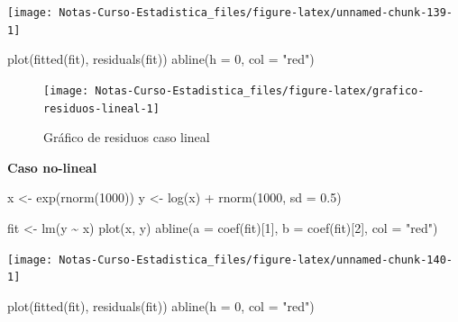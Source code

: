\documentclass[
  12pt,
]{book}
\newenvironment{Shaded}{\begin{snugshade}}{\end{snugshade}}
\newcommand{\AttributeTok}[1]{\textcolor[rgb]{0.77,0.63,0.00}{#1}}
\newcommand{\DecValTok}[1]{\textcolor[rgb]{0.00,0.00,0.81}{#1}}
\newcommand{\FloatTok}[1]{\textcolor[rgb]{0.00,0.00,0.81}{#1}}
\newcommand{\FunctionTok}[1]{\textcolor[rgb]{0.00,0.00,0.00}{#1}}
\newcommand{\NormalTok}[1]{#1}
\newcommand{\OtherTok}[1]{\textcolor[rgb]{0.56,0.35,0.01}{#1}}
\newcommand{\SpecialCharTok}[1]{\textcolor[rgb]{0.00,0.00,0.00}{#1}}
\newcommand{\StringTok}[1]{\textcolor[rgb]{0.31,0.60,0.02}{#1}}
\theoremstyle{definition}
\theoremstyle{definition}
\theoremstyle{definition}
\theoremstyle{definition}
\theoremstyle{remark}
\begin{document}
\begin{center}\texttt{[image: Notas-Curso-Estadistica\_files/figure-latex/unnamed-chunk-139-1]} \end{center}

\begin{Shaded}
\begin{Highlighting}[]
\FunctionTok{plot}\NormalTok{(}\FunctionTok{fitted}\NormalTok{(fit), }\FunctionTok{residuals}\NormalTok{(fit))}
\FunctionTok{abline}\NormalTok{(}\AttributeTok{h =} \DecValTok{0}\NormalTok{, }\AttributeTok{col =} \StringTok{"red"}\NormalTok{)}
\end{Highlighting}
\end{Shaded}

\begin{figure}

{\centering \texttt{[image: Notas-Curso-Estadistica\_files/figure-latex/grafico-residuos-lineal-1]} 

}

\caption{Gráfico de residuos caso lineal}\label{fig:grafico-residuos-lineal}
\end{figure}

\textbf{Caso no-lineal}

\begin{Shaded}
\begin{Highlighting}[]
\NormalTok{x }\OtherTok{\textless{}{-}} \FunctionTok{exp}\NormalTok{(}\FunctionTok{rnorm}\NormalTok{(}\DecValTok{1000}\NormalTok{))}
\NormalTok{y }\OtherTok{\textless{}{-}} \FunctionTok{log}\NormalTok{(x) }\SpecialCharTok{+} \FunctionTok{rnorm}\NormalTok{(}\DecValTok{1000}\NormalTok{, }\AttributeTok{sd =} \FloatTok{0.5}\NormalTok{)}

\NormalTok{fit }\OtherTok{\textless{}{-}} \FunctionTok{lm}\NormalTok{(y }\SpecialCharTok{\textasciitilde{}}\NormalTok{ x)}
\FunctionTok{plot}\NormalTok{(x, y)}
\FunctionTok{abline}\NormalTok{(}\AttributeTok{a =} \FunctionTok{coef}\NormalTok{(fit)[}\DecValTok{1}\NormalTok{], }\AttributeTok{b =} \FunctionTok{coef}\NormalTok{(fit)[}\DecValTok{2}\NormalTok{], }\AttributeTok{col =} \StringTok{"red"}\NormalTok{)}
\end{Highlighting}
\end{Shaded}

\begin{center}\texttt{[image: Notas-Curso-Estadistica\_files/figure-latex/unnamed-chunk-140-1]} \end{center}

\begin{Shaded}
\begin{Highlighting}[]
\FunctionTok{plot}\NormalTok{(}\FunctionTok{fitted}\NormalTok{(fit), }\FunctionTok{residuals}\NormalTok{(fit))}
\FunctionTok{abline}\NormalTok{(}\AttributeTok{h =} \DecValTok{0}\NormalTok{, }\AttributeTok{col =} \StringTok{"red"}\NormalTok{)}
\end{Highlighting}
\end{Shaded}
\end{document}
